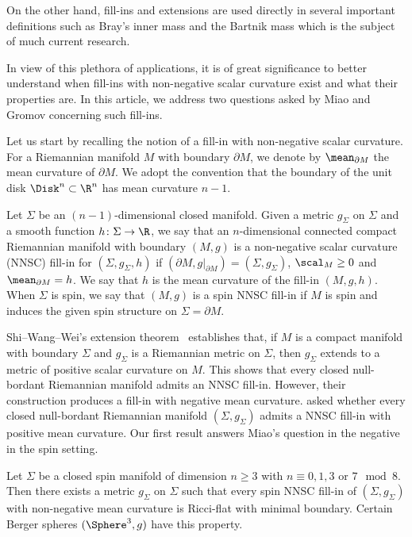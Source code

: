 \documentclass[a4paper,11pt]{amsart}
\numberwithin{equation}{section}
\begin{document}
On the other hand, fill-ins and extensions are used directly in several important definitions such as Bray's inner mass \cite{bray2001proof} and the Bartnik mass \cite{bartnik1989new} which is the subject of much current research.

In view of this plethora of applications, it is of great significance to better understand when fill-ins with non-negative scalar curvature exist and what their properties are.
In this article, we address two questions asked by Miao \cite[Question 2]{miao2021nonexistence} and Gromov \cite[page 3]{gromov2019scalar} concerning such fill-ins.

Let us start by recalling the notion of a fill-in with non-negative scalar curvature.
For a Riemannian manifold $M$ with boundary $\partial M$, we denote by $\mean_{\partial M}$ the mean curvature of $\partial M$.
We adopt the convention that the boundary of the unit disk $\Disk^n\subset\R^n$ has mean curvature \(n-1\).

\begin{definition}
Let $\Sigma$ be an $(n-1)$-dimensional closed manifold.
Given a metric $g_\Sigma$ on $\Sigma$ and a smooth function $h\colon\Sigma\to\R$, we say that an $n$-dimensional connected compact Riemannian manifold with boundary $(M,g)$ is a non-negative scalar curvature (NNSC) fill-in for $(\Sigma,g_\Sigma,h)$ if $(\partial M,g|_{\partial M})=(\Sigma,g_\Sigma)$, $\scal_M\geq0$ and $\mean_{\partial M}=h$.
We say that $h$ is the mean curvature of the fill-in $(M,g,h)$.
When $\Sigma$ is spin, we say that $(M,g)$ is a spin NNSC fill-in if $M$ is spin and induces the given spin structure on $\Sigma=\partial M$.
\end{definition}

Shi--Wang--Wei's extension theorem~\cite[Theorem~1]{shi2022total} establishes that, if $M$ is a compact manifold with boundary $\Sigma$ and $g_\Sigma$ is a Riemannian metric on $\Sigma$, then $g_\Sigma$ extends to a metric of positive scalar curvature on $M$. 
This shows that every closed null-bordant Riemannian manifold admits an NNSC fill-in.
However, their construction produces a fill-in with negative mean curvature.
\textcite[Question 2]{miao2021nonexistence} asked whether every closed null-bordant Riemannian manifold $(\Sigma,g_\Sigma)$ admits a NNSC fill-in with positive mean curvature.
Our first result answers Miao's question in the negative in the spin setting.


\begin{theorem}\label{Thm:Berger}
Let $\Sigma$ be a closed spin manifold of dimension $n \geq 3$ with $n \equiv 0,1,3$ or $7 \mod 8$.
Then there exists a metric $g_\Sigma$ on $\Sigma$ such that every spin NNSC fill-in of $(\Sigma,g_\Sigma)$ with non-negative mean curvature is Ricci-flat with minimal boundary.
Certain Berger spheres $(\Sphere^3,g)$ have this property.
%
\end{theorem}
\end{document}
